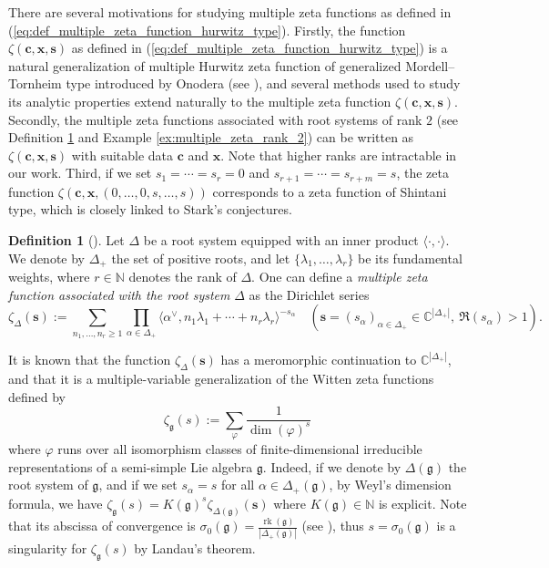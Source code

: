 \documentclass[a4paper]{amsart}
\theoremstyle{remark}
\theoremstyle{definition}
\newtheorem{definition}[theorem]{Definition}
\DeclareMathOperator{\rk}{rk}
\begin{document}
There are several motivations for studying multiple zeta functions as defined in (\ref{eq:def_multiple_zeta_function_hurwitz_type}). Firstly, the function $\zeta(\mathbf{c},\mathbf{x},\mathbf{s})$ as defined in (\ref{eq:def_multiple_zeta_function_hurwitz_type}) is a natural generalization of multiple Hurwitz zeta function of generalized Mordell–Tornheim type introduced by Onodera (see \cite{onodera2021multiple}), and several methods used to study its analytic properties extend naturally to the multiple zeta function $\zeta(\mathbf{c},\mathbf{x},\mathbf{s})$. Secondly, the multiple zeta functions associated with root systems of rank $2$ (see Definition \ref{def:multiple_zeta_root_system} and Example \ref{ex:multiple_zeta_rank_2}) can be written as $\zeta(\mathbf{c},\mathbf{x},\mathbf{s})$ with suitable data $\mathbf{c}$ and $\mathbf{x}$. Note that higher ranks are intractable in our work. Third, if we set $s_1=\cdots=s_r=0$ and $s_{r+1}=\cdots=s_{r+m}=s$, the zeta function $\zeta(\mathbf{c},\mathbf{x},(0,\ldots,0,s,\ldots,s))$ corresponds to a zeta function of Shintani type, which is closely linked to Stark's conjectures.

\begin{definition}
[\cite{komori2023root}]
\label{def:multiple_zeta_root_system}
Let $\Delta$ be a root system equipped with an inner product $\langle \cdot , \cdot \rangle$. We denote by $\Delta_+$ the set of positive roots, and let $\{ \lambda_1,\ldots,\lambda_r \}$ be its fundamental weights, where $r \in \mathbb{N}$ denotes the rank of $\Delta$. One can define a \textit{multiple zeta function associated with the root system} $\Delta$ as the Dirichlet series
$$ \zeta_{\Delta}(\mathbf{s}) := \sum_{n_1,\ldots,n_r \geq 1} \prod_{\alpha \in \Delta_+} \langle \alpha^{\vee}, n_1 \lambda_1 + \cdots + n_r \lambda_r \rangle^{-s_{\alpha}} \quad (\mathbf{s}=(s_{\alpha})_{\alpha \in \Delta_+} \in \mathbb{C}^{|\Delta_+|}, \ \Re(s_{\alpha})>1). $$
\end{definition}

It is known that the function $\zeta_{\Delta}(\mathbf{s})$ has a meromorphic continuation to $\mathbb{C}^{|\Delta_+|}$, and that it is a multiple-variable generalization of the Witten zeta functions defined by
$$ \zeta_{\mathfrak{g}}(s) := \sum_{\varphi} \frac{1}{\dim(\varphi)^s} $$
where $\varphi$ runs over all isomorphism classes of finite-dimensional irreducible representations of a semi-simple Lie algebra $\mathfrak{g}$. Indeed, if we denote by $\Delta(\mathfrak{g})$ the root system of $\mathfrak{g}$, and if we set $s_{\alpha}=s$ for all $\alpha \in \Delta_+(\mathfrak{g})$, by Weyl's dimension formula, we have $\zeta_{\mathfrak{g}}(s)=K(\mathfrak{g})^s \zeta_{\Delta(\mathfrak{g})}(\mathbf{s})$ where $K(\mathfrak{g}) \in \mathbb{N}$ is explicit. Note that its abscissa of convergence is $\sigma_0(\mathfrak{g})=\frac{\rk(\mathfrak{g})}{|\Delta_+(\mathfrak{g})|}$ (see \cite{larsen2008representation}), thus $s=\sigma_0(\mathfrak{g})$ is a singularity for $\zeta_{\mathfrak{g}}(s)$ by Landau's theorem.
\end{document}

